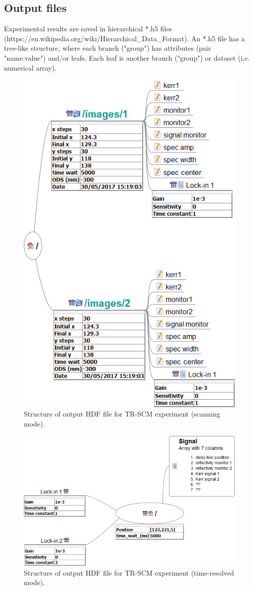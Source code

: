 \documentclass[14pt,a4paper] {article}
\begin{document}
\subsection{Output files}

Experimental results are saved in hierarchical *.h5 files (https://en.wikipedia.org/wiki/Hierarchical_Data_Format). An *.h5 file has a tree-like structure, where each branch ("group") has attributes (pair "name:value") and/or leafs. Each leaf is another branch ("group") or dataset (i.e. numerical array).

\begin{figure}
\includegraphics[width = 0.8\linewidth]{HDF5-format.png}
\caption{Structure of output HDF file for TR-SCM experiment (scanning mode).}
\end{figure}

\begin{figure}
\includegraphics[width = 0.8\linewidth]{HDF5-format2.png}
\caption{Structure of output HDF file for TR-SCM experiment (time-resolved mode).}
\end{figure}
\end{document}
